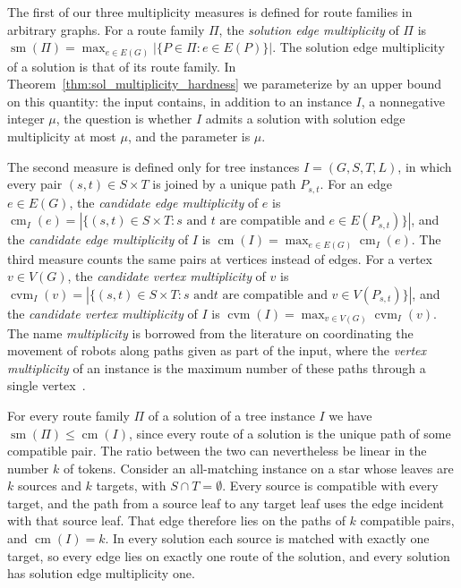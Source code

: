 \documentclass[a4paper,USenglish,thm-restate]{lipics-v2021}
\newcommand{\cm}{\operatorname{cm}}
\newcommand{\cvm}{\operatorname{cvm}}
\newcommand{\solc}{\operatorname{sm}}
\theoremstyle{problemstyle}
\begin{document}
The first of our three multiplicity measures is defined for route families in
arbitrary graphs. For a route family $\Pi$, the \emph{solution edge multiplicity}
of $\Pi$ is
$\solc(\Pi)=\max_{e\in E(G)}|\{P\in\Pi:e\in E(P)\}|$. The solution edge
multiplicity of a solution is that of its route family. In
Theorem~\ref{thm:sol_multiplicity_hardness} we parameterize by an upper
bound on this quantity: the input contains, in addition to an instance $I$,
a nonnegative integer $\mu$, the question is whether $I$ admits a solution
with solution edge multiplicity at most $\mu$, and the parameter is $\mu$.

The second measure is defined only for tree instances $I=(G,S,T,L)$, in which
every pair $(s,t)\in S\times T$ is joined by a unique path $P_{s,t}$. For an
edge $e\in E(G)$, the \emph{candidate edge multiplicity} of $e$ is
$\cm_I(e)=|\{(s,t)\in S\times T: s\text{ and }t\text{ are compatible and }e\in
E(P_{s,t})\}|$, and the \emph{candidate edge multiplicity} of $I$ is
$\cm(I)=\max_{e\in E(G)}\cm_I(e)$. The third measure counts the same pairs at
vertices instead of edges. For a vertex $v\in V(G)$, the \emph{candidate
vertex multiplicity} of $v$ is $\cvm_I(v)=|\{(s,t)\in S\times T: s\text{ and
}t\text{ are compatible and }v\in V(P_{s,t})\}|$, and the \emph{candidate
vertex multiplicity} of $I$ is $\cvm(I)=\max_{v\in V(G)}\cvm_I(v)$. The name
\emph{multiplicity} is borrowed from the literature on coordinating the movement of robots
along paths given as part of the input, where the \emph{vertex multiplicity}
of an instance is the maximum number of these paths through a single
vertex~\cite{DBLP:conf/atal/AbrahamsenGHU23}.

For every route family $\Pi$ of a solution of a tree instance $I$ we have
$\solc(\Pi)\le \cm(I)$, since every route of a solution is the unique path of some
compatible pair. The ratio between the two can nevertheless be linear in the
number $k$ of tokens. Consider an all-matching instance on a star whose leaves
are $k$ sources and $k$ targets, with $S\cap T=\emptyset$. Every source is
compatible with every target, and the path from a source leaf to any target
leaf uses the edge incident with that source leaf. That edge therefore lies on
the paths of $k$ compatible pairs, and $\cm(I)=k$. In every solution each source
is matched with exactly one target, so every edge lies on exactly one route
of the solution, and every solution has solution edge multiplicity one.
\end{document}
